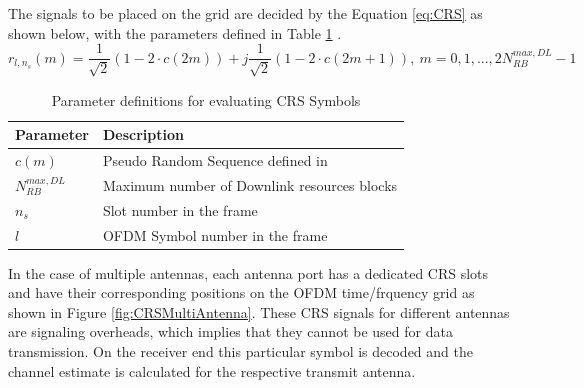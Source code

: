         The signals to be placed on the grid are decided by the Equation \ref{eq:CRS} as shown below, with the parameters defined in Table \ref{tab:CRSParam} \cite{3gpp36211}.
        \begin{equation} \label{eq:CRS}
            r_{l,n_s}(m) = \frac{1}{\sqrt{2}}(1-2{\cdot}c(2m)) + j\frac{1}{\sqrt{2}}(1-2{\cdot}c(2m+1)),\ m=0,1,...,2N_{RB}^{max,DL}-1
        \end{equation}

        \begin{table}[H]
            \begin{center}
                \begin{tabular}{|l|l|}
                    \hline
                    Parameter& Description\\ \hline
                    $c(m)$& Pseudo Random Sequence defined in \cite{3gpp36211}\\ \hline
                    $N_{RB}^{max,DL}$& Maximum number of Downlink resources blocks\\ \hline
                    $n_s$& Slot number in the frame\\ \hline
                    $l$& OFDM Symbol number in the frame\\
                    \hline
                \end{tabular}
                \caption{Parameter definitions for evaluating CRS Symbols}
                \label{tab:CRSParam}
            \end{center}
        \end{table}

        In the case of multiple antennas, each antenna port has a dedicated CRS slots and have their corresponding positions on the OFDM time/frquency grid as shown in Figure \ref{fig:CRSMultiAntenna}. These CRS signals for different antennas are signaling overheads, which implies that they cannot be used for data transmission. On the receiver end this particular symbol is decoded and the channel estimate is calculated for the respective transmit antenna.

